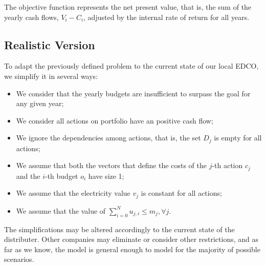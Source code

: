 The objective function represents the net present value, that is,
the sum of the yearly cash flows, $V_i - C_i$, adjusted by the internal rate of return for all years.

\subsection{Realistic Version}

To adapt the previously defined problem to the current state of our local EDCO, we simplify it in several  ways:

\begin{itemize}
\item We consider that the yearly budgets are insufficient to surpass the goal for any given year;

\item We consider all actions on portfolio have an positive cash flow;

\item We ignore the dependencies among actions, that is, the set $D_j$ is empty
for all actions; %

\item We assume that both the vectors that define the costs of the $j$-th  action $c_j$
and the $i$-th budget $o_i$ have size 1;%

\item We assume that the electricity  value $v_j$ is constant for all actions;

\item We assume that the value of $\sum_{i=0}^{N} u_{j,i} \leq m_j, \forall j$.

\end{itemize}

The simplifications may be altered accordingly to the current
state of the distributer. Other companies may eliminate or consider other restrictions,
and as far as we know, the model is general enough to model for the
majority of possible scenarios.





